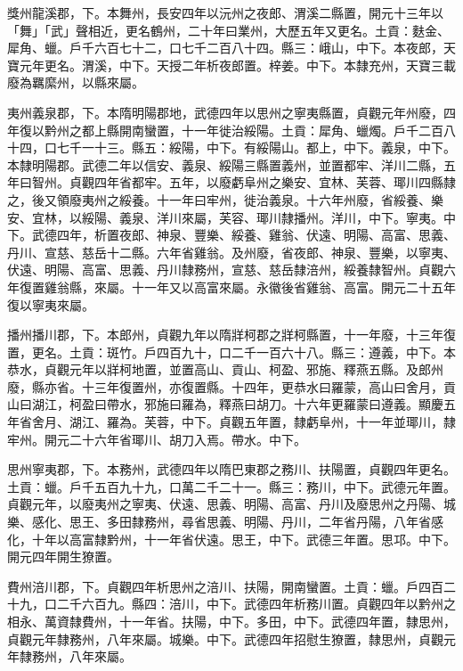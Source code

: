\begin{pinyinscope}
 獎州龍溪郡，下。本舞州，長安四年以沅州之夜郎、渭溪二縣置，開元十三年以「舞」「武」聲相近，更名鶴州，二十年曰業州，大歷五年又更名。土貢：麩金、犀角、蠟。戶千六百七十二，口七千二百八十四。縣三：峨山，中下。本夜郎，天寶元年更名。渭溪，中下。天授二年析夜郎置。梓姜。中下。本隸充州，天寶三載廢為羈縻州，以縣來屬。



 夷州義泉郡，下。本隋明陽郡地，武德四年以思州之寧夷縣置，貞觀元年州廢，四年復以黔州之都上縣開南蠻置，十一年徙治綏陽。土貢：犀角、蠟燭。戶千二百八十四，口七千一十三。縣五：綏陽，中下。有綏陽山。都上，中下。義泉，中下。本隸明陽郡。武德二年以信安、義泉、綏陽三縣置義州，並置都牢、洋川二縣，五年曰智州。貞觀四年省都牢。五年，以廢虧阜州之樂安、宜林、芙蓉、瑘川四縣隸之，後又領廢夷州之綏養。十一年曰牢州，徙治義泉。十六年州廢，省綏養、樂安、宜林，以綏陽、義泉、洋川來屬，芙容、瑘川隸播州。洋川，中下。寧夷。中下。武德四年，析置夜郎、神泉、豐樂、綏養、雞翁、伏遠、明陽、高富、思義、丹川、宣慈、慈岳十二縣。六年省雞翁。及州廢，省夜郎、神泉、豐樂，以寧夷、伏遠、明陽、高富、思義、丹川隸務州，宣慈、慈岳隸涪州，綏養隸智州。貞觀六年復置雞翁縣，來屬。十一年又以高富來屬。永徽後省雞翁、高富。開元二十五年復以寧夷來屬。



 播州播川郡，下。本郎州，貞觀九年以隋牂柯郡之牂柯縣置，十一年廢，十三年復置，更名。土貢：斑竹。戶四百九十，口二千一百六十八。縣三：遵義，中下。本恭水，貞觀元年以牂柯地置，並置高山、貢山、柯盈、邪施、釋燕五縣。及郎州廢，縣亦省。十三年復置州，亦復置縣。十四年，更恭水曰羅蒙，高山曰舍月，貢山曰湖江，柯盈曰帶水，邪施曰羅為，釋燕曰胡刀。十六年更羅蒙曰遵義。顯慶五年省舍月、湖江、羅為。芙蓉，中下。貞觀五年置，隸虧阜州，十一年並瑘川，隸牢州。開元二十六年省瑘川、胡刀入焉。帶水。中下。



 思州寧夷郡，下。本務州，武德四年以隋巴東郡之務川、扶陽置，貞觀四年更名。土貢：蠟。戶千五百九十九，口萬二千二十一。縣三：務川，中下。武德元年置。貞觀元年，以廢夷州之寧夷、伏遠、思義、明陽、高富、丹川及廢思州之丹陽、城樂、感化、思王、多田隸務州，尋省思義、明陽、丹川，二年省丹陽，八年省感化，十年以高富隸黔州，十一年省伏遠。思王，中下。武德三年置。思邛。中下。開元四年開生獠置。



 費州涪川郡，下。貞觀四年析思州之涪川、扶陽，開南蠻置。土貢：蠟。戶四百二十九，口二千六百九。縣四：涪川，中下。武德四年析務川置。貞觀四年以黔州之相永、萬資隸費州，十一年省。扶陽，中下。多田，中下。武德四年置，隸思州，貞觀元年隸務州，八年來屬。城樂。中下。武德四年招慰生獠置，隸思州，貞觀元年隸務州，八年來屬。




\end{pinyinscope}
